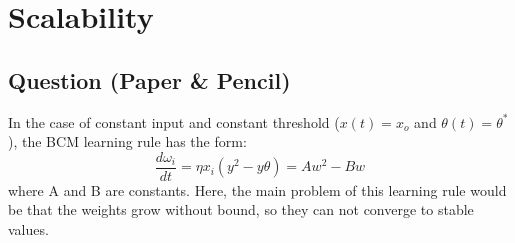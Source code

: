 \section{Scalability}

\subsection*{Question (Paper \& Pencil)}     %

In the case of constant input and constant threshold ($x(t)=x_o$ and $\theta(t) = \theta^*$), the BCM learning rule has the form: 
\begin{equation}
\frac{d\omega_i}{dt} = \eta x_i(y^2-y\theta)= Aw^2-Bw
\end{equation}
where A and B are constants. Here, the main problem of this learning rule would be that the weights grow without bound, so they can not converge to stable values.  

